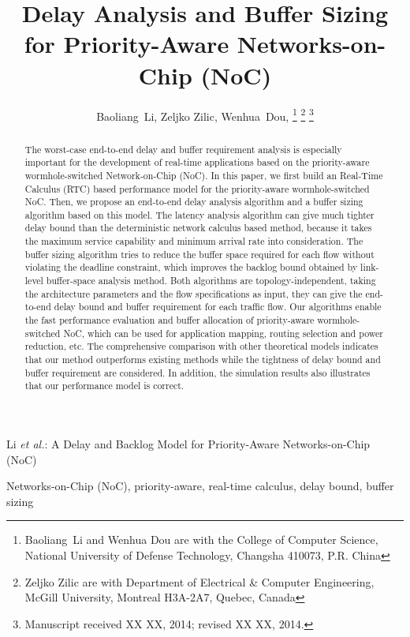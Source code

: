 \documentclass[10pt,journal]{IEEEtran}
\begin{document}
\title{Delay Analysis and Buffer Sizing for Priority-Aware Networks-on-Chip (NoC)}

\author{Baoliang~Li, %
        Zeljko Zilic, %
        Wenhua~Dou, %
\thanks{Baoliang~Li and Wenhua Dou are with the College of Computer Science, National University of Defense Technology, Changsha 410073, P.R. China}%
\thanks{Zeljko Zilic are with Department of Electrical \& Computer Engineering, McGill University, Montreal H3A-2A7, Quebec, Canada}%
\thanks{Manuscript received XX XX, 2014; revised XX XX, 2014.}}

%
{Li \MakeLowercase{\textit{et al.}}: A Delay and Backlog Model for Priority-Aware Networks-on-Chip (NoC)}

\maketitle

\begin{abstract}
The worst-case end-to-end delay and buffer requirement analysis is especially important for the development of real-time applications based on the priority-aware wormhole-switched Network-on-Chip (NoC). In this paper, we first build an Real-Time Calculus (RTC) based performance model for the priority-aware wormhole-switched NoC. Then, we propose an end-to-end delay analysis algorithm and a buffer sizing algorithm based on this model. The latency analysis algorithm can give much tighter delay bound than the deterministic network calculus based method, because it takes the maximum service capability and minimum arrival rate into consideration. The buffer sizing algorithm tries to reduce the buffer space required for each flow without violating the deadline constraint, which improves the backlog bound obtained by link-level buffer-space analysis method. Both algorithms are topology-independent, taking the architecture parameters and the flow specifications as input, they can give the end-to-end delay bound and buffer requirement for each traffic flow. Our algorithms enable the fast performance evaluation and buffer allocation of priority-aware wormhole-switched NoC, which can be used for application mapping, routing selection and power reduction, etc. The comprehensive comparison with other theoretical models indicates that our method outperforms existing methods while the tightness of delay bound and buffer requirement are considered. In addition, the simulation results also illustrates that our performance model is correct.
\end{abstract}
\begin{IEEEkeywords}
Networks-on-Chip (NoC), priority-aware, real-time calculus, delay bound, buffer sizing
\end{IEEEkeywords}
\end{document}
